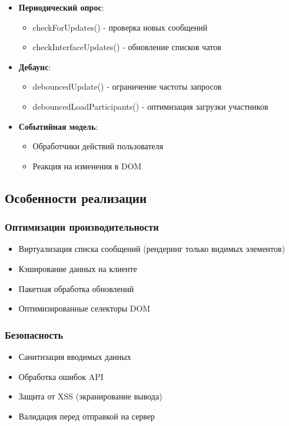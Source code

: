 \begin{itemize}
	\item \textbf{Периодический опрос}:
	\begin{itemize}
		\item checkForUpdates() - проверка новых сообщений
		\item checkInterfaceUpdates() - обновление списков чатов
	\end{itemize}
	
	\item \textbf{Дебаунс}:
	\begin{itemize}
		\item debouncedUpdate() - ограничение частоты запросов
		\item debouncedLoadParticipants() - оптимизация загрузки участников
	\end{itemize}
	
	\item \textbf{Событийная модель}:
	\begin{itemize}
		\item Обработчики действий пользователя
		\item Реакция на изменения в DOM
	\end{itemize}
	
\end{itemize}

\subsection{Особенности реализации}

\subsubsection{Оптимизации производительности}

\begin{itemize}
	\item Виртуализация списка сообщений (рендеринг только видимых элементов)
	\item Кэширование данных на клиенте
	\item Пакетная обработка обновлений
	\item Оптимизированные селекторы DOM
\end{itemize}

\subsubsection{Безопасность}

\begin{itemize}
	\item Санитизация вводимых данных
	\item Обработка ошибок API
	\item Защита от XSS (экранирование вывода)
	\item Валидация перед отправкой на сервер
\end{itemize}

